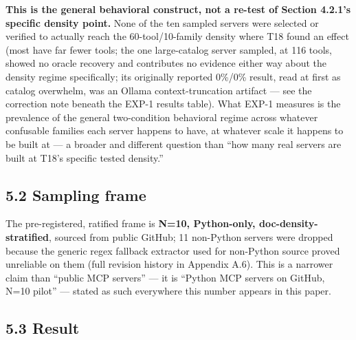 \textbf{This is the general behavioral construct, not a re-test of
Section 4.2.1's specific density point.} None of the ten sampled servers
were selected or verified to actually reach the 60-tool/10-family
density where T18 found an effect (most have far fewer tools; the one
large-catalog server sampled, at 116 tools, showed no oracle recovery
and contributes no evidence either way about the density regime
specifically; its originally reported 0\%/0\% result, read at first as
catalog overwhelm, was an Ollama context-truncation artifact --- see the
correction note beneath the EXP-1 results table). What EXP-1 measures
is the prevalence of the general two-condition behavioral regime across
whatever confusable families each server happens to have, at whatever
scale it happens to be built at --- a broader and different question
than ``how many real servers are built at T18's specific tested
density.''

\hypertarget{sampling-frame}{%
\subsection{5.2 Sampling frame}\label{sampling-frame}}

The pre-registered, ratified frame is \textbf{N=10, Python-only,
doc-density-stratified}, sourced from public GitHub; 11 non-Python
servers were dropped because the generic regex fallback extractor used
for non-Python source proved unreliable on them (full revision history
in Appendix A.6). This is a narrower claim than ``public MCP servers''
--- it is ``Python MCP servers on GitHub, N=10 pilot'' --- stated as
such everywhere this number appears in this paper.

\hypertarget{result}{%
\subsection{5.3 Result}\label{result}}


